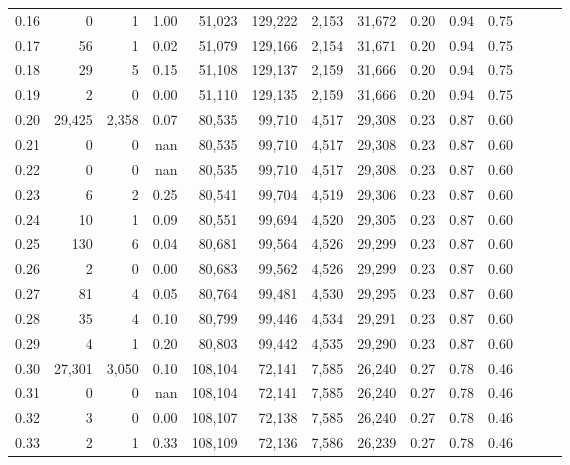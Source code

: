 \begin{tabular}{rrrrrrrrrrrrrr}
0.16 &       0 &      1 &  1.00 &   51,023 &  129,222 &   2,153 &  31,672 &  0.20 &  0.94 &      0.75 \\
0.17 &      56 &      1 &  0.02 &   51,079 &  129,166 &   2,154 &  31,671 &  0.20 &  0.94 &      0.75 \\
0.18 &      29 &      5 &  0.15 &   51,108 &  129,137 &   2,159 &  31,666 &  0.20 &  0.94 &      0.75 \\
0.19 &       2 &      0 &  0.00 &   51,110 &  129,135 &   2,159 &  31,666 &  0.20 &  0.94 &      0.75 \\
0.20 &  29,425 &  2,358 &  0.07 &   80,535 &   99,710 &   4,517 &  29,308 &  0.23 &  0.87 &      0.60 \\
0.21 &       0 &      0 &   nan &   80,535 &   99,710 &   4,517 &  29,308 &  0.23 &  0.87 &      0.60 \\
0.22 &       0 &      0 &   nan &   80,535 &   99,710 &   4,517 &  29,308 &  0.23 &  0.87 &      0.60 \\
0.23 &       6 &      2 &  0.25 &   80,541 &   99,704 &   4,519 &  29,306 &  0.23 &  0.87 &      0.60 \\
0.24 &      10 &      1 &  0.09 &   80,551 &   99,694 &   4,520 &  29,305 &  0.23 &  0.87 &      0.60 \\
0.25 &     130 &      6 &  0.04 &   80,681 &   99,564 &   4,526 &  29,299 &  0.23 &  0.87 &      0.60 \\
0.26 &       2 &      0 &  0.00 &   80,683 &   99,562 &   4,526 &  29,299 &  0.23 &  0.87 &      0.60 \\
0.27 &      81 &      4 &  0.05 &   80,764 &   99,481 &   4,530 &  29,295 &  0.23 &  0.87 &      0.60 \\
0.28 &      35 &      4 &  0.10 &   80,799 &   99,446 &   4,534 &  29,291 &  0.23 &  0.87 &      0.60 \\
0.29 &       4 &      1 &  0.20 &   80,803 &   99,442 &   4,535 &  29,290 &  0.23 &  0.87 &      0.60 \\
0.30 &  27,301 &  3,050 &  0.10 &  108,104 &   72,141 &   7,585 &  26,240 &  0.27 &  0.78 &      0.46 \\
0.31 &       0 &      0 &   nan &  108,104 &   72,141 &   7,585 &  26,240 &  0.27 &  0.78 &      0.46 \\
0.32 &       3 &      0 &  0.00 &  108,107 &   72,138 &   7,585 &  26,240 &  0.27 &  0.78 &      0.46 \\
0.33 &       2 &      1 &  0.33 &  108,109 &   72,136 &   7,586 &  26,239 &  0.27 &  0.78 &      0.46 \\

\end{tabular}
